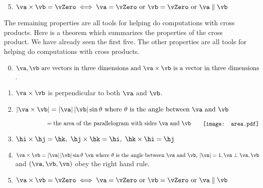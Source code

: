 \begin{enumerate}[(1)]
\setcounter{enumi}{4}

\item $\va\times\vb=\vZero\iff \va=\vZero \text{ or }\vb=\vZero 
\text{ or }\va\parallel\vb$

\end{enumerate}

\noindent
The remaining properties are all tools for
helping do computations with cross products.
Here is a theorem which summarizes the properties of the cross product.
We have already seen the first five. The other properties are all tools 
for helping do computations with cross products.

\begin{theorem}\label{thm:crossPppties}
\begin{enumerate}[(1)]
\setcounter{enumi}{-1}

\item $\va,\vb\text{ are vectors in three dimensions and }
\va\times\vb\text{ is a vector in three dimensions}$.

\item $\va\times\vb$ is perpendicular to both  $\va$ and $\vb$.

\bigskip
\item $|\va\times\vb|=|\va|\,|\vb|\sin\theta
\text{ where $\theta$ is the angle between $\va$ and $\vb$}$

$\phantom{|\va\times\vb|}=\text{the area of the parallelogram
with sides $\va$ and $\vb$}\qquad
\smash{\raisebox{-0.1\height}{\texttt{[image: area.pdf]}}}$

\item $\hi\times\hj=\hk,\ \hj\times\hk=\hi,\ \hk\times\hi=\hj$


\item $\va\times\vb=|\va|\,|\vb|\sin\theta\ \vn
\text{ where $\theta$ is the angle between $\va$ and $\vb$, }
|\vn|=1,\\ \vn\perp\va,\vb$
  and $(\va,\vb,\vn)$ obey the right hand rule.

\item $\va\times\vb=\vZero\iff \va=\vZero \text{ or }\vb=\vZero 
\text{ or }\va\parallel\vb$


\end{enumerate}
\end{theorem}


